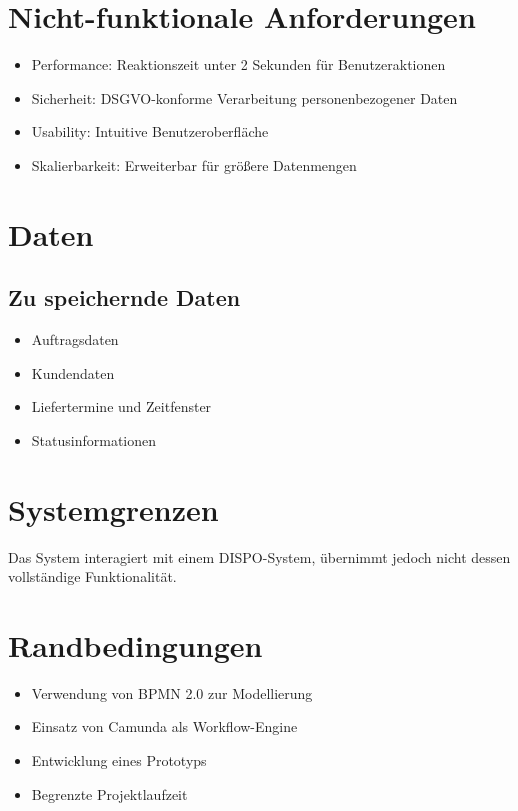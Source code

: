 \documentclass[12pt,a4paper]{article}
\begin{document}
\section{Nicht-funktionale Anforderungen}
\begin{itemize}
    \item Performance: Reaktionszeit unter 2 Sekunden für Benutzeraktionen
    \item Sicherheit: DSGVO-konforme Verarbeitung personenbezogener Daten
    \item Usability: Intuitive Benutzeroberfläche
    \item Skalierbarkeit: Erweiterbar für größere Datenmengen
\end{itemize}

\section{Daten}
\subsection{Zu speichernde Daten}
\begin{itemize}
    \item Auftragsdaten
    \item Kundendaten
    \item Liefertermine und Zeitfenster
    \item Statusinformationen
\end{itemize}

\section{Systemgrenzen}
Das System interagiert mit einem DISPO-System, übernimmt jedoch nicht dessen vollständige Funktionalität.

\section{Randbedingungen}
\begin{itemize}
    \item Verwendung von BPMN 2.0 zur Modellierung
    \item Einsatz von Camunda als Workflow-Engine
    \item Entwicklung eines Prototyps
    \item Begrenzte Projektlaufzeit
\end{itemize}
\end{document}
